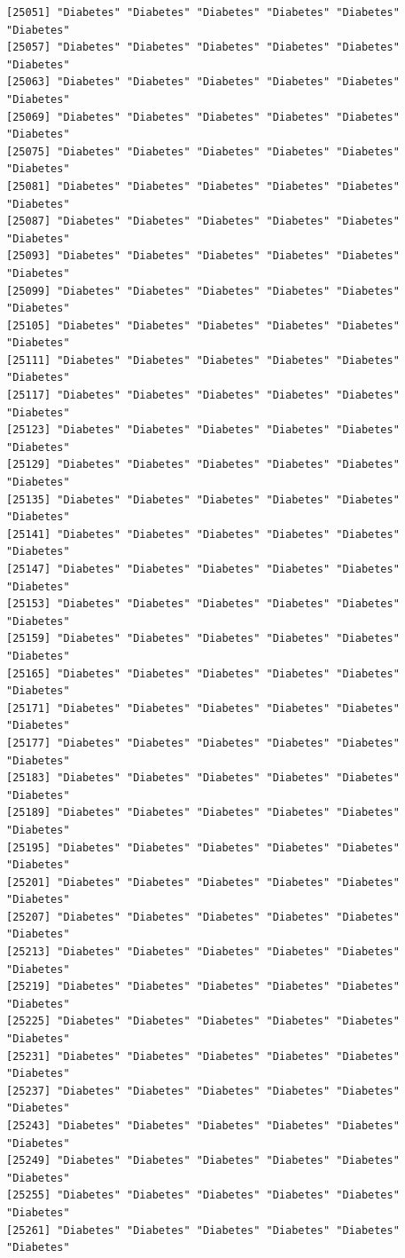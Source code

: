 \documentclass[
  letterpaper,
  DIV=11,
  numbers=noendperiod]{scrartcl}
\begin{document}
\begin{verbatim}
[25051] "Diabetes" "Diabetes" "Diabetes" "Diabetes" "Diabetes" "Diabetes"
[25057] "Diabetes" "Diabetes" "Diabetes" "Diabetes" "Diabetes" "Diabetes"
[25063] "Diabetes" "Diabetes" "Diabetes" "Diabetes" "Diabetes" "Diabetes"
[25069] "Diabetes" "Diabetes" "Diabetes" "Diabetes" "Diabetes" "Diabetes"
[25075] "Diabetes" "Diabetes" "Diabetes" "Diabetes" "Diabetes" "Diabetes"
[25081] "Diabetes" "Diabetes" "Diabetes" "Diabetes" "Diabetes" "Diabetes"
[25087] "Diabetes" "Diabetes" "Diabetes" "Diabetes" "Diabetes" "Diabetes"
[25093] "Diabetes" "Diabetes" "Diabetes" "Diabetes" "Diabetes" "Diabetes"
[25099] "Diabetes" "Diabetes" "Diabetes" "Diabetes" "Diabetes" "Diabetes"
[25105] "Diabetes" "Diabetes" "Diabetes" "Diabetes" "Diabetes" "Diabetes"
[25111] "Diabetes" "Diabetes" "Diabetes" "Diabetes" "Diabetes" "Diabetes"
[25117] "Diabetes" "Diabetes" "Diabetes" "Diabetes" "Diabetes" "Diabetes"
[25123] "Diabetes" "Diabetes" "Diabetes" "Diabetes" "Diabetes" "Diabetes"
[25129] "Diabetes" "Diabetes" "Diabetes" "Diabetes" "Diabetes" "Diabetes"
[25135] "Diabetes" "Diabetes" "Diabetes" "Diabetes" "Diabetes" "Diabetes"
[25141] "Diabetes" "Diabetes" "Diabetes" "Diabetes" "Diabetes" "Diabetes"
[25147] "Diabetes" "Diabetes" "Diabetes" "Diabetes" "Diabetes" "Diabetes"
[25153] "Diabetes" "Diabetes" "Diabetes" "Diabetes" "Diabetes" "Diabetes"
[25159] "Diabetes" "Diabetes" "Diabetes" "Diabetes" "Diabetes" "Diabetes"
[25165] "Diabetes" "Diabetes" "Diabetes" "Diabetes" "Diabetes" "Diabetes"
[25171] "Diabetes" "Diabetes" "Diabetes" "Diabetes" "Diabetes" "Diabetes"
[25177] "Diabetes" "Diabetes" "Diabetes" "Diabetes" "Diabetes" "Diabetes"
[25183] "Diabetes" "Diabetes" "Diabetes" "Diabetes" "Diabetes" "Diabetes"
[25189] "Diabetes" "Diabetes" "Diabetes" "Diabetes" "Diabetes" "Diabetes"
[25195] "Diabetes" "Diabetes" "Diabetes" "Diabetes" "Diabetes" "Diabetes"
[25201] "Diabetes" "Diabetes" "Diabetes" "Diabetes" "Diabetes" "Diabetes"
[25207] "Diabetes" "Diabetes" "Diabetes" "Diabetes" "Diabetes" "Diabetes"
[25213] "Diabetes" "Diabetes" "Diabetes" "Diabetes" "Diabetes" "Diabetes"
[25219] "Diabetes" "Diabetes" "Diabetes" "Diabetes" "Diabetes" "Diabetes"
[25225] "Diabetes" "Diabetes" "Diabetes" "Diabetes" "Diabetes" "Diabetes"
[25231] "Diabetes" "Diabetes" "Diabetes" "Diabetes" "Diabetes" "Diabetes"
[25237] "Diabetes" "Diabetes" "Diabetes" "Diabetes" "Diabetes" "Diabetes"
[25243] "Diabetes" "Diabetes" "Diabetes" "Diabetes" "Diabetes" "Diabetes"
[25249] "Diabetes" "Diabetes" "Diabetes" "Diabetes" "Diabetes" "Diabetes"
[25255] "Diabetes" "Diabetes" "Diabetes" "Diabetes" "Diabetes" "Diabetes"
[25261] "Diabetes" "Diabetes" "Diabetes" "Diabetes" "Diabetes" "Diabetes"

\end{verbatim}
\end{document}
